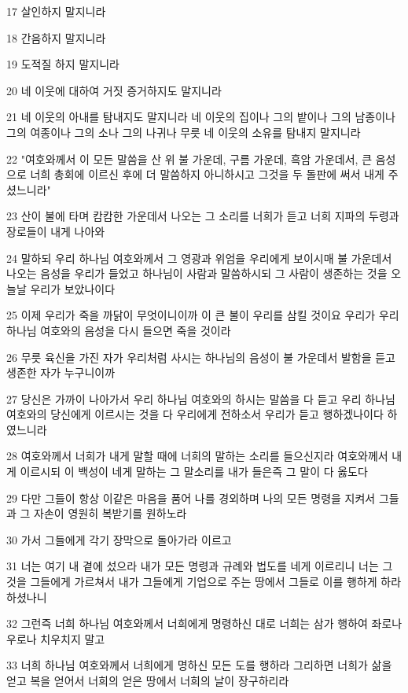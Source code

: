 \par 17 살인하지 말지니라
\par 18 간음하지 말지니라
\par 19 도적질 하지 말지니라
\par 20 네 이웃에 대하여 거짓 증거하지도 말지니라
\par 21 네 이웃의 아내를 탐내지도 말지니라 네 이웃의 집이나 그의 밭이나 그의 남종이나 그의 여종이나 그의 소나 그의 나귀나 무릇 네 이웃의 소유를 탐내지 말지니라
\par 22 "여호와께서 이 모든 말씀을 산 위 불 가운데, 구름 가운데, 흑암 가운데서, 큰 음성으로 너희 총회에 이르신 후에 더 말씀하지 아니하시고 그것을 두 돌판에 써서 내게 주셨느니라"
\par 23 산이 불에 타며 캄캄한 가운데서 나오는 그 소리를 너희가 듣고 너희 지파의 두령과 장로들이 내게 나아와
\par 24 말하되 우리 하나님 여호와께서 그 영광과 위엄을 우리에게 보이시매 불 가운데서 나오는 음성을 우리가 들었고 하나님이 사람과 말씀하시되 그 사람이 생존하는 것을 오늘날 우리가 보았나이다
\par 25 이제 우리가 죽을 까닭이 무엇이니이까 이 큰 불이 우리를 삼킬 것이요 우리가 우리 하나님 여호와의 음성을 다시 들으면 죽을 것이라
\par 26 무릇 육신을 가진 자가 우리처럼 사시는 하나님의 음성이 불 가운데서 발함을 듣고 생존한 자가 누구니이까
\par 27 당신은 가까이 나아가서 우리 하나님 여호와의 하시는 말씀을 다 듣고 우리 하나님 여호와의 당신에게 이르시는 것을 다 우리에게 전하소서 우리가 듣고 행하겠나이다 하였느니라
\par 28 여호와께서 너희가 내게 말할 때에 너희의 말하는 소리를 들으신지라 여호와께서 내게 이르시되 이 백성이 네게 말하는 그 말소리를 내가 들은즉 그 말이 다 옳도다
\par 29 다만 그들이 항상 이같은 마음을 품어 나를 경외하며 나의 모든 명령을 지켜서 그들과 그 자손이 영원히 복받기를 원하노라
\par 30 가서 그들에게 각기 장막으로 돌아가라 이르고
\par 31 너는 여기 내 곁에 섰으라 내가 모든 명령과 규례와 법도를 네게 이르리니 너는 그것을 그들에게 가르쳐서 내가 그들에게 기업으로 주는 땅에서 그들로 이를 행하게 하라 하셨나니
\par 32 그런즉 너희 하나님 여호와께서 너희에게 명령하신 대로 너희는 삼가 행하여 좌로나 우로나 치우치지 말고
\par 33 너희 하나님 여호와께서 너희에게 명하신 모든 도를 행하라 그리하면 너희가 삶을 얻고 복을 얻어서 너희의 얻은 땅에서 너희의 날이 장구하리라


